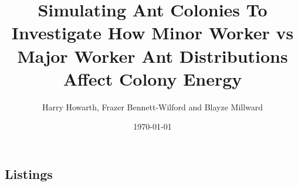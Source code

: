 \documentclass[11pt,oneside,titlepage]{article}
\title{Simulating Ant Colonies To Investigate How Minor Worker vs Major Worker Ant Distributions Affect Colony Energy}
\author{Harry Howarth, Frazer Bennett-Wilford and Blayze Millward}
\date{\today}
\begin{document}
  \maketitle
  
  \tableofcontents
  
  
  
  
  
  \newpage
  
  \newpage
  
  \newpage
  
  \newpage
  
  
  
  \newpage
  
  

  \newpage
  \begin{appendix}
   
    \listoffigures
    \listoftables
    \section*{Listings}
  \end{appendix}
  
\end{document}
